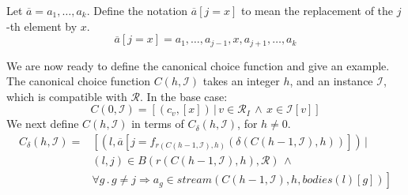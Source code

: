 Let $\overline{a} = a_1, \ldots, a_k$.  Define the notation $\overline{a}[j = x]$ to mean the replacement of the $j$-th element by $x$.
$$ \overline{a}[j = x] = a_1, \ldots, a_{j-1}, x, a_{j+1}, \ldots, a_{k}$$

We are now ready to define the canonical choice function and give an example.  The canonical choice function $C(h, \mathcal{I})$ takes an integer $h$, and an instance $\mathcal{I}$, which is compatible with $\mathcal{R}$.  In the base case:
$$C(0,\mathcal{I}) = [(c_v,[x]) \, | \, v \in \mathcal{R}_I \, \land \, x \in \mathcal{I}[v]]$$
We next define $C(h,\mathcal{I})$ in terms of $C_\delta(h,\mathcal{I})$, for $h \neq 0$.
\begin{equation*}
\begin{split}
C_\delta(h,\mathcal{I}) = & \left[ (l, \overline{a}[j =  f_{r(C(h-1,\mathcal{I}),h)}(\delta(C(h-1,\mathcal{I}),h))]) \, | \right. \\
& \left. (l,j) \in B(r(C(h-1,\mathcal{I}),h), \mathcal{R}) \, \land \right. \\
& \left. \forall g \, . \, g \neq j \Rightarrow a_g \in stream(C(h-1,\mathcal{I}),h,bodies(l)[g]) \right]
\end{split}
\end{equation*}

